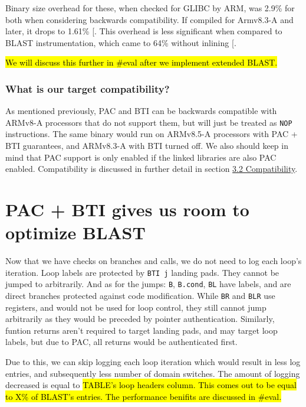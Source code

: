 \documentclass[a4paper, nobind]{templates/ociamthesis}
\begin{document}
Binary size overhead for these, when checked for GLIBC by ARM, was 2.9\% for both
when considering backwards compatibility. If compiled for Armv8.3-A and later,
it drops to 1.61\% {[}\citeproc{ref-arm-pacbti}{9}{]}.
This overhead is less significant when compared to BLAST instrumentation, which
came to 64\% without inlining {[}\citeproc{ref-blast}{55}{]}.

\hl{We will discuss this further in \#eval after we implement extended BLAST.}

\subsubsection{What is our target compatibility?}\label{what-is-our-target-compatibility}

As mentioned previously, PAC and BTI can be backwards compatible with ARMv8-A processors
that do not support them, but will just be treated as \texttt{NOP} instructions.
The same binary would run on ARMv8.5-A processors with PAC + BTI guarantees, and
ARMv8.3-A with BTI turned off.
We also should keep in mind that PAC support is only enabled if the linked libraries
are also PAC enabled.
Compatibility is discussed in further detail in section \hyperref[compatibility]{3.2 Compatibility}.

\section{PAC + BTI gives us room to optimize BLAST}\label{optimizing-blast}

Now that we have checks on branches and calls, we do not need to log each loop's iteration.
Loop labels are protected by \texttt{BTI\ j} landing pads. They cannot be jumped to arbitrarily.
And as for the jumps: \texttt{B}, \texttt{B.cond}, \texttt{BL} have labels, and are direct branches protected
against code modification.
While \texttt{BR} and \texttt{BLR} use registers, and would not be used for loop control,
they still cannot jump arbitrarily as they would be preceded by pointer authentication.
Similarly, funtion returns aren't required to target landing pads, and may target loop labels,
but due to PAC, all returns would be authenticated first.

Due to this, we can skip logging each loop iteration which would result in less
log entries, and subsequently less number of domain switches. The amount of logging
decreased is equal to \hl{TABLE's loop headers column. This comes out to be
equal to X\% of BLAST's entries. The performance benifits are discussed in \#eval.}
\end{document}

